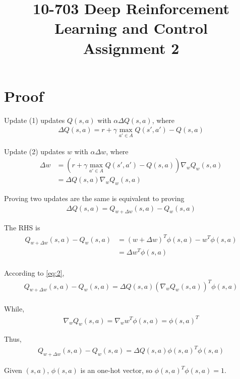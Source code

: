\documentclass{article}
\title{10-703 Deep Reinforcement Learning and Control \\ Assignment 2 \\}
\date{}
\begin{document}
\maketitle

\section{Proof}
Update (1) updates $Q(s,a)$ with $\alpha \Delta Q(s,a)$, where
\begin{align}
  \label{eq:1}
  \Delta Q(s,a) = r + \gamma \max_{a' \in A} Q(s', a') - Q(s,a)
\end{align}

Update (2) updates $w$ with $\alpha \Delta w$, where
\begin{align}
  \label{eq:2}
  \Delta w &= (r + \gamma \max_{a' \in A} Q(s', a') - Q(s,a)) \nabla_{w} Q_{w}(s,a) \\
           &= \Delta Q(s,a) \nabla_{w} Q_{w}(s,a) 
\end{align}

Proving two updates are the same is equivalent to proving
\begin{align}
  \label{eq:3}
  \Delta Q(s,a) = Q_{w+\Delta w}(s,a) - Q_{w}(s,a) 
\end{align}

The RHS is 
\begin{align}
  \label{eq:4}
  Q_{w+\Delta w}(s,a) - Q_{w}(s,a) &= (w + \Delta w)^{T} \phi(s,a) - w^{T} \phi(s,a) \\
                                   &= \Delta w^{T} \phi(s,a) \\
\end{align}

According to \eqref{eq:2},
\begin{align}
  \label{eq:5}
  Q_{w+\Delta w}(s,a) - Q_{w}(s,a) = \Delta Q(s,a) (\nabla_{w} Q_{w}(s,a))^{T} \phi(s,a)\\
\end{align}

While,
\begin{align}
  \label{eq:6}
  \nabla_{w} Q_{w}(s,a) = \nabla_{w} w^{T}\phi(s,a) = \phi(s,a)^{T}
\end{align}

Thus,
\begin{align}
  \label{eq:7}
  Q_{w+\Delta w}(s,a) - Q_{w}(s,a) = \Delta Q(s,a) \phi(s,a)^{T} \phi(s,a)
\end{align}

Given $(s,a)$, $\phi(s,a)$ is an one-hot vector, so $\phi(s,a)^{T} \phi(s,a) = 1$.
\end{document}
